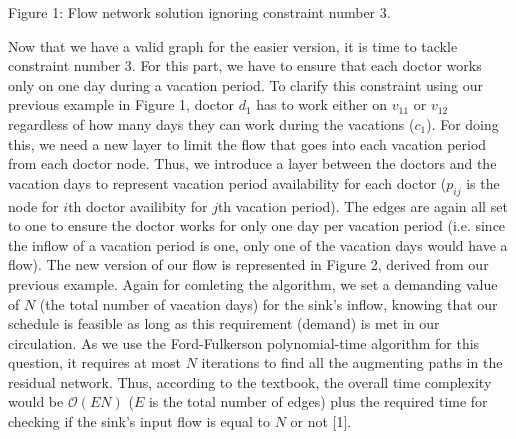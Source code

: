 \vspace*{0.2cm}
{\centering {} \par}
{\centering Figure 1: Flow network solution ignoring constraint number 3.\par}

Now that we have a valid graph for the easier version, it is time to tackle constraint number 3. For this part,
we have to ensure that each doctor works only on one day during a vacation period. To clarify this constraint using our previous example in Figure 1,
doctor $d_1$ has to work either on $v_{11}$ or $v_{12}$ regardless of how many days they can work during the vacations ($c_1$). For doing this, we need 
a new layer to limit the flow that goes into each vacation period from each doctor node. Thus, we introduce a layer between the doctors and the vacation days
to represent vacation period availability for each doctor ($p_{ij}$ is the node for $i$th doctor availibity for $j$th vacation period). The edges are again all set
to one to ensure the doctor works for only one day per vacation period (i.e. since the inflow of a vacation period is one, only one of the
vacation days would have a flow). The new version of our flow is represented in Figure 2, derived from our previous example. 
Again for comleting the algorithm, we set a demanding value of $N$ (the total number of vacation days) for the sink's inflow, knowing that our schedule is feasible as long as this
requirement (demand) is met in our circulation. As we use the Ford-Fulkerson polynomial-time algorithm for this question, it requires at most
$N$ iterations to find all the augmenting paths in the residual network. Thus, according to the textbook, the overall time complexity would be $\mathcal{O}(EN)$ ($E$ is the total number of edges) plus the required time
for checking if the sink's input flow is equal to $N$ or not [1].

